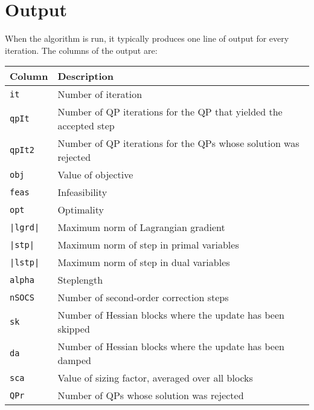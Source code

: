 \documentclass[	11pt,
				a4paper,
				abstract=true,
				twoside=true,
				bibliography=totoc, 
				headinclude=true,
				footinclude=false]{scrartcl}
\begin{document}
\section{Output}
When the algorithm is run, it typically produces one line of output for every iteration. The columns of the output are:

\begin{tabular}[c]{ll}
Column & Description\\\hline\hline
\texttt{it}		&	Number of iteration \\\hline
\texttt{qpIt}	&	Number of QP iterations for the QP that yielded the accepted step \\\hline
\texttt{qpIt2}	&	Number of QP iterations for the QPs whose solution was rejected \\\hline
\texttt{obj}	&	Value of objective \\\hline
\texttt{feas}	&	Infeasibility \\\hline
\texttt{opt}	&	Optimality \\\hline
\texttt{|lgrd|}	&	Maximum norm of Lagrangian gradient \\\hline
\texttt{|stp|}	&	Maximum norm of step in primal variables \\\hline
\texttt{|lstp|}	&	Maximum norm of step in dual variables \\\hline
\texttt{alpha}	&	Steplength \\\hline
\texttt{nSOCS}	&	Number of second-order correction steps \\\hline
\texttt{sk}		&	Number of Hessian blocks where the update has been skipped \\\hline
\texttt{da}		&	Number of Hessian blocks where the update has been damped \\\hline
\texttt{sca}	&	Value of sizing factor, averaged over all blocks \\\hline
\texttt{QPr}	&	Number of QPs whose solution was rejected
\\\hline
\end{tabular}




\clearpage
\appendix
\end{document}
